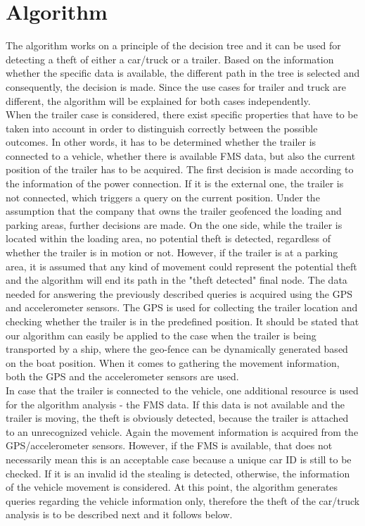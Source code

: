 \section{Algorithm}
The algorithm works on a principle of the decision tree and it can be used for detecting a theft of either a car/truck or a trailer. Based on the information whether the specific data is available, the different path in the tree is selected and consequently, the decision is made. Since the use cases for trailer and truck are different, the algorithm will be explained for both cases independently.\\
When the trailer case is considered, there exist specific properties that have to be taken into account in order to distinguish correctly between the possible outcomes. In other words, it has to be determined whether the trailer is connected to a vehicle, whether there is available FMS data, but also the current position of the trailer has to be acquired. 
The first decision is made according to the information of the power connection. If it is the external one, the trailer is not connected, which triggers a query on the current position. Under the assumption that the company that owns the trailer geofenced the loading and parking areas, further decisions are made. On the one side, while the trailer is located within the loading area, no potential theft is detected, regardless of whether the trailer is in motion or not. However, if the trailer is at a parking area, it is assumed that any kind of movement could represent the potential theft and the algorithm will end its path in the "theft detected" final node. The data needed for answering the previously described queries is acquired using the GPS and accelerometer sensors. The GPS is used for collecting the trailer location and checking whether the trailer is in the predefined position. It should be stated that our algorithm can easily be applied to the case when the trailer is being transported by a ship, where the geo-fence can be dynamically generated based on the boat position. When it comes to gathering the movement information, both the GPS and the accelerometer sensors are used. \\
In case that the trailer is connected to the vehicle, one additional resource is used for the algorithm analysis - the FMS data. If this data is not available and the trailer is moving, the theft is obviously detected, because the trailer is attached to an unrecognized vehicle. Again the movement information is acquired from the GPS/accelerometer sensors. However, if the FMS is available, that does not necessarily mean this is an acceptable case because a unique car ID is still to be checked. If it is an invalid id the stealing is detected, otherwise, the information of the vehicle movement is considered. At this point, the algorithm generates queries regarding the vehicle information only, therefore the theft of the car/truck analysis is to be described next and it follows below.\\
